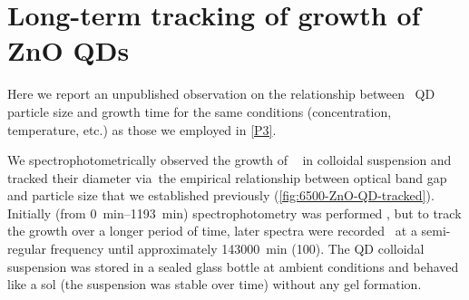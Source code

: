 \documentclass[draft,webedition,openright,titles,swedish,english]{LuaUUThesis}\usepackage[]{graphicx}\usepackage[]{xcolor}
\newcommand{\etc}{etc.}
\newcommand{\via}{via}
\begin{document}
%

\section{Long-term tracking of growth of ZnO QDs}
\label{results:P21-tracking-growth-ZnO-QDs}

Here we report an unpublished observation on the relationship between
\ZnO\ \gls{QD} particle size and growth time for the same conditions (concentration,
temperature, \etc) as those we employed in \cref{P3}.

We spectrophotometrically observed the growth of \ZnO\  in
colloidal suspension and tracked their diameter \via\ the
empirical relationship between optical band gap and particle size that
we established previously (\cref{fig:6500-ZnO-QD-tracked}).
Initially (from \qtyrange{0}{1193}{\minute}) spectrophotometry was performed \insitu,
but to track the growth over a longer period of time,
later spectra were recorded \exsitu\
at a semi-regular frequency until approximately \qty{143000}{\minute} (\qty{100}{\days}).
The \gls{QD} colloidal suspension was stored in a sealed glass bottle at ambient conditions
and behaved like a sol (the suspension was stable over time) without any gel formation.


%
\end{document}
